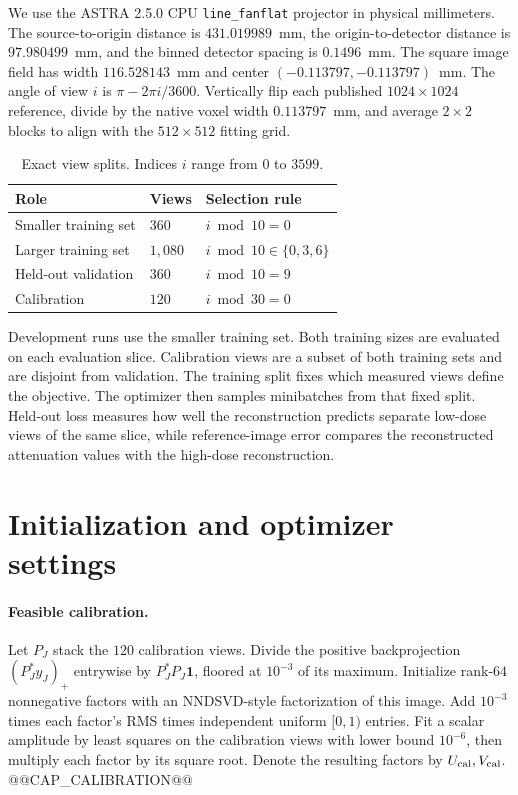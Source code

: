 \documentclass[11pt]{article}
\begin{document}
We use the ASTRA 2.5.0 CPU \texttt{line\_fanflat} projector in physical millimeters. The source-to-origin distance is \(431.019989\)~mm, the origin-to-detector distance is \(97.980499\)~mm, and the binned detector spacing is \(0.1496\)~mm. The square image field has width \(116.528143\)~mm and center \((-0.113797,-0.113797)\)~mm. The angle of view \(i\) is \(\pi-2\pi i/3600\). Vertically flip each published \(1024\times1024\) reference, divide by the native voxel width \(0.113797\)~mm, and average \(2\times2\) blocks to align with the \(512\times512\) fitting grid.

\begin{table}[htbp]
  \centering
  \caption{Exact view splits. Indices \(i\) range from \(0\) to \(3599\).}
  \label{tab:ct-splits}
  \begin{tabular}{@{}lll@{}}
    \toprule
    Role & Views & Selection rule \\
    \midrule
    Smaller training set & \(360\) & \(i\bmod 10=0\) \\
    Larger training set & \(1{,}080\) & \(i\bmod 10\in\{0,3,6\}\) \\
    Held-out validation & \(360\) & \(i\bmod 10=9\) \\
    Calibration & \(120\) & \(i\bmod 30=0\) \\
    \bottomrule
  \end{tabular}
\end{table}

Development runs use the smaller training set. Both training sizes are evaluated on each evaluation slice. Calibration views are a subset of both training sets and are disjoint from validation. The training split fixes which measured views define the objective. The optimizer then samples minibatches from that fixed split. Held-out loss measures how well the reconstruction predicts separate low-dose views of the same slice, while reference-image error compares the reconstructed attenuation values with the high-dose reconstruction.

\section{Initialization and optimizer settings}
\label{sec:ct-settings}

\paragraph{Feasible calibration.}
Let \(P_J\) stack the \(120\) calibration views. Divide the positive backprojection \((P_J^\ast y_J)_+\) entrywise by \(P_J^\ast P_J\mathbf{1}\), floored at \(10^{-3}\) of its maximum. Initialize rank-\(64\) nonnegative factors with an NNDSVD-style factorization of this image. Add \(10^{-3}\) times each factor's RMS times independent uniform \([0,1)\) entries. Fit a scalar amplitude by least squares on the calibration views with lower bound \(10^{-6}\), then multiply each factor by its square root. Denote the resulting factors by \(U_{\rm cal},V_{\rm cal}\). @@CAP_CALIBRATION@@
\end{document}

